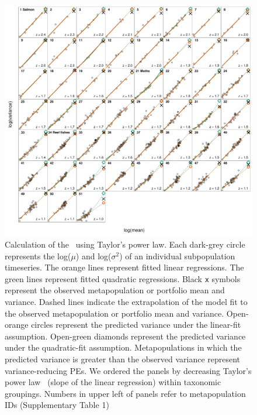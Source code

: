 \begin{figure}[htbp]
  \centering
  \includegraphics[width=\textwidth]{prophets/taylor-fits-scatter-20120720.pdf}
  \caption[Calculation of the \tilmanPE\ using Taylor's power law.]{Calculation of the \tilmanPE\ using Taylor's power law. Each
    dark-grey circle  represents the log($\mu$) and log($\sigma^2$) of an
    individual subpopulation timeseries.  The orange lines represent fitted
    linear regressions.  The green lines represent fitted quadratic
    regressions.  Black \texttt{x} symbols represent the observed
    metapopulation or portfolio mean and variance.  Dashed lines indicate the
    extrapolation of the model fit to the observed metapopulation or portfolio
    mean and variance.  Open-orange circles represent the predicted variance
    under the linear-fit assumption.  Open-green diamonds represent the
    predicted variance under the quadratic-fit assumption.  Metapopulations in
    which the predicted variance is greater than the observed variance
    represent variance-reducing PEs.  We ordered the panels by decreasing
    Taylor's power law \zvalue\ (slope of the linear regression) within
    taxonomic groupings.  Numbers in upper left of panels refer to
    metapopulation IDs (Supplementary Table 1)}
\label{fig:Taylor-fits}
\end{figure}

